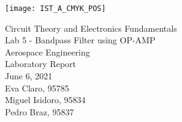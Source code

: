 
\thispagestyle {empty}

\texttt{[image: IST\_A\_CMYK\_POS]}

\begin{center}
%
\vspace{1.0cm}

\vspace{2cm}
{\FontLb Circuit Theory and Electronics Fundamentals} \\ %
\vspace{1cm}
{\FontLb Lab 5 - Bandpass Filter using OP-AMP} \\ %
\vspace{1cm}
{\FontLb Aerospace Engineering} \\ %
\vspace{4cm}
{\FontSn Laboratory Report} \\
\vspace{0.5cm}
{\FontSn June 6, 2021} \\ %
\vspace{7cm}
{\FontSn Eva Claro, 95785} \\
\vspace{0.5cm}
{\FontSn Miguel Isidoro, 95834} \\
\vspace{0.5cm}
{\FontSn Pedro Braz, 95837} \\
\newpage
%
\end{center}

